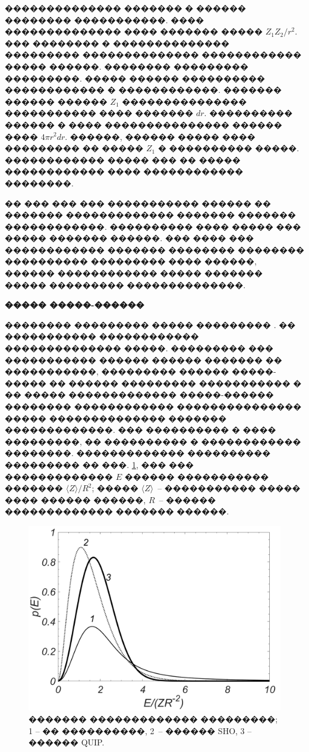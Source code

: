 \documentclass[12pt,titlepage]{article}
\begin{document}
�������������� ������� � ������ �������� �����������. ���� �������������� ���� ������� ����� $Z_1 Z_2/r^2$. ��� �������� � �������������� ��������� �������������� ������������ ����� ������. �������� ��������� ���������. ����� ������ ���������� ������������ � ������������. ������� ������ ������ $Z_1$ ��������������� ����������� ���� ������� $dr$. ���������� ������ � ���� ��������������� ������ ���� $4 \pi r^2 dr$. ������, ������ ����� ���� ��������� �� ����� $Z_1$ � ���������� �����. ������������ ����� ��� �� ����� ������������ ���� ������������ ��������.

�� ��� ��� ��� ����������� ������ �� ������� ������������� ������� ������� ������������. ���������� ���� ����� ��� ����� ������� ������. ��� ���� ��� ������������ ������� �������� �������� ���������� ��������� ���� ������, ������ ������������ ����� ������� ����� ��������� ��������������.

\bigskip

\textbf{����� �����-������}

�������� ��������� ����� ��������� \cite{Holtsmark}. �� ����������� ������������ �������������� �����. ��������� ��� ����������� ������ ������ ������� �� �����������, ��������� ������ �����-����� �� ������ ��������� ����������� � �� ����� ������������� �����-������ �������� ������������ ��������������� ����� �������������� ������� �������������. ��� ���������� � ���� ���������, �� ���������� � ������������ ��������. ������������� ���������� ��������� �� ���. \ref{figDistrib}, ��� ��� ������������� $E$ ������ ����������� ������� $\langle Z \rangle /R^2$; ����� $\langle Z \rangle$~-- ����������� ����� ���� ������ ������, $R$~-- ������ ������������� ������� ������.

\begin{figure}[h!]
\centerline{
\includegraphics[width=0.7\linewidth]{Distributions.png}
}
\caption{������� ������������� ���������; 1 -- �� ����������, 2~-- ������ SHO, 3 -- ������ QUIP.} \label{figDistrib}
\end{figure}
\end{document}
